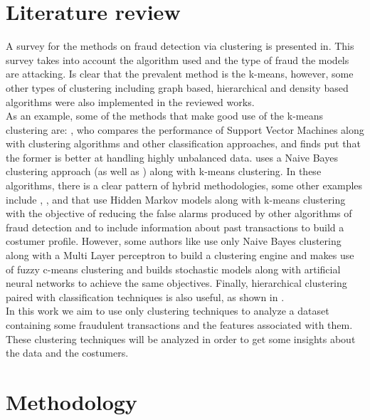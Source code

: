\documentclass[conference]{IEEEtran}
\begin{document}
\section{Literature review}
A survey for the methods on fraud detection via clustering is presented in\cite{Sabau2012}. This survey takes into account the algorithm used and the type of fraud the models are attacking. Is clear that the prevalent method is the k-means, however, some other types of clustering including graph based, hierarchical and density based algorithms were also implemented in the reviewed works. \\
As an example, some of the methods that make good use of the k-means clustering are: \cite{Wang2019a}, who compares the performance of Support Vector Machines along with clustering algorithms and other classification approaches, and finds put that the former is better at handling highly unbalanced data. \cite{Santos2018} uses a Naive Bayes clustering approach (as well as \cite{Carneiro2015a}) along with k-means clustering. In these algorithms, there is a clear pattern of hybrid methodologies, some other examples include \cite{Sathyapriya2019}, \cite{Kumari2017}, and \cite{Fashoto2016a} that use Hidden Markov models along with k-means clustering with the objective of reducing the false alarms produced by other algorithms of fraud detection and to include information about past transactions to build a costumer profile. However, some authors like \cite{Carneiro2015a} use only Naive Bayes clustering along with a Multi Layer perceptron to build a clustering engine and \cite{Behera2015a} makes use of fuzzy c-means clustering and builds stochastic models along with artificial neural networks to achieve the same objectives. Finally, hierarchical clustering paired with classification techniques is also useful, as shown in \cite{Wang2018}. \\
In this work we aim to use only clustering techniques to analyze a dataset containing some fraudulent transactions and the features associated with them. These clustering techniques will be analyzed in order to get some insights about the data and the costumers.

\section{Methodology}
\end{document}
